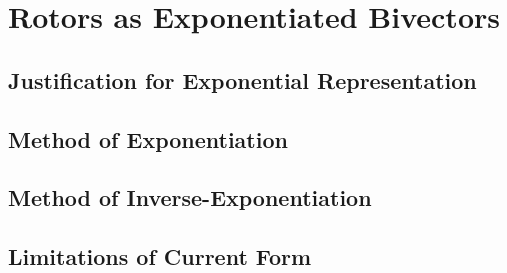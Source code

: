 \chapter{Rotors as Exponentiated Bivectors}

\section{Justification for Exponential Representation}
\section{Method of Exponentiation}
\section{Method of Inverse-Exponentiation}
\section{Limitations of Current Form}

